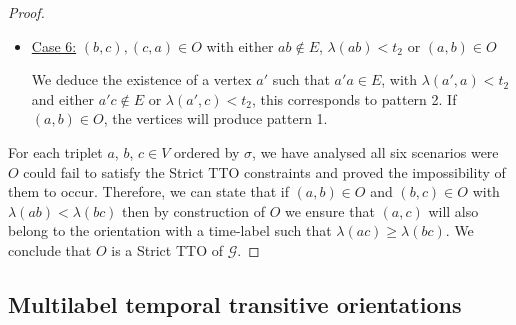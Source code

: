 \documentclass[runningheads]{llncs}
\begin{document}
\begin{proof}
\begin{itemize}
\item \underline{Case 6:} $(b,c),(c,a) \in O$ with either $ab \notin E$, $\lambda(ab) < t_2$ or $(a,b) \in O$ 
\begin{figure}[H]
    \begin{center}
        \hspace{5ex}
    \end{center}
\end{figure}
        
We deduce the existence of a vertex $a'$ such that $a'a \in E$, with $\lambda(a',a) < t_2$ and either $a'c \notin E$ or $\lambda(a',c) < t_2$,  this corresponds to pattern 2. If $(a,b) \in O$, the vertices will produce pattern 1.

\end{itemize}

For each triplet $a$, $b$, $c \in V$ ordered by $\sigma$, we have analysed all six scenarios were $O$ could fail to satisfy the Strict TTO constraints and proved the impossibility of them to occur. Therefore, we can state that if $(a,b) \in O$ and $(b,c) \in O$ with $\lambda(ab) < \lambda(bc)$ then by construction of $O$ we ensure that $(a,c)$ will also belong to the orientation with a time-label such that $\lambda(ac) \geq \lambda(bc)$. We conclude that $O$ is a Strict TTO of $\mathcal{G}$.
\end{proof}


\subsection{Multilabel temporal transitive orientations}
\label{appendix:mtto}
\end{document}
